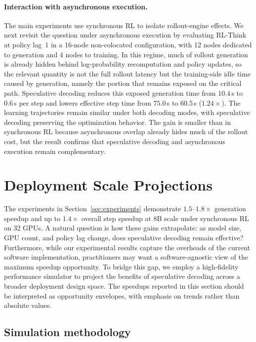 \documentclass[11pt, logo, onecolumn, copyright, colorlinks=true, allcolors=blue]{nvidiatechreport}
\begin{document}
\paragraph{Interaction with asynchronous execution.}
The main experiments use synchronous RL to isolate rollout-engine effects. We next revisit the question under asynchronous execution by evaluating RL-Think at policy lag~1 in a 16-node non-colocated configuration, with 12 nodes dedicated to generation and 4 nodes to training. In this regime, much of rollout generation is already hidden behind log-probability recomputation and policy updates, so the relevant quantity is not the full rollout latency but the training-side idle time caused by generation, namely the portion that remains exposed on the critical path. Speculative decoding reduces this exposed generation time from $10.4$\,s to $0.6$\,s per step and lowers effective step time from $75.0$\,s to $60.5$\,s ($1.24\times$). The learning trajectories remain similar under both decoding modes, with speculative decoding preserving the optimization behavior. The gain is smaller than in synchronous RL because asynchronous overlap already hides much of the rollout cost, but the result confirms that speculative decoding and asynchronous execution remain complementary.

\section{Deployment Scale Projections}
\label{sec:projections}

The experiments in Section~\ref{sec:experiments} demonstrate $1.5$--$1.8\times$ generation speedup and up to $1.4\times$ overall step speedup at 8B scale under synchronous RL on 32 GPUs. A natural question is how these gains extrapolate: as model size, GPU count, and policy lag change, does speculative decoding remain effective? Furthermore, while our experimental results capture the overheads of the current software implementation, practitioners may want a software-agnostic view of the maximum speedup opportunity. To bridge this gap, we employ a high-fidelity performance simulator to project the benefits of speculative decoding across a broader deployment design space. The speedups reported in this section should be interpreted as opportunity envelopes, with emphasis on trends rather than absolute values.

\subsection{Simulation methodology}
\end{document}
